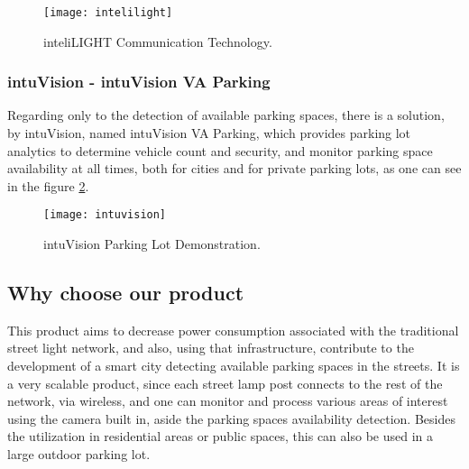 \begin{figure}[ht]
	\centering
	\texttt{[image: intelilight]}
	\caption{inteliLIGHT Communication Technology.}
	\label{fig:intelilight}
\end{figure}

\subsubsection{intuVision - intuVision VA Parking}
Regarding only to the detection of available parking spaces, there is a solution, by intuVision, named intuVision VA Parking, which provides parking lot analytics to determine vehicle count and security, and monitor parking space availability at all times, both for cities and for private parking lots, as one can see in the figure \ref{fig:intuvision}. \cite{parking}

\begin{figure}[ht]
	\centering
	\texttt{[image: intuvision]}
	\caption{intuVision Parking Lot Demonstration.}
	\label{fig:intuvision}
\end{figure}

\subsection{Why choose our product}

This product aims to decrease power consumption associated with the traditional street light network, and also, using that infrastructure, contribute to the development of a smart city detecting available parking spaces in the streets. It is a very scalable product, since each street lamp post connects to the rest of the network, via wireless, and one can monitor and process various areas of interest using the camera built in, aside the parking spaces availability detection. Besides the utilization in residential areas or public spaces, this can also be used in a large outdoor parking lot.